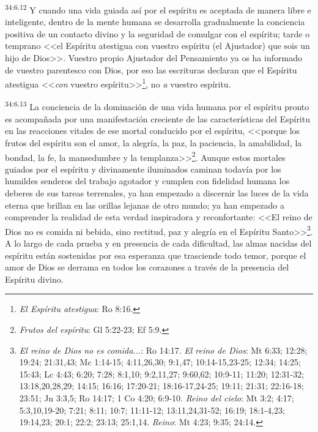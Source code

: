 \par
\textsuperscript{34:6.12} Y cuando una vida guiada así por el espíritu es aceptada de manera libre e inteligente, dentro de la mente humana se desarrolla gradualmente la conciencia positiva de un contacto divino y la seguridad de comulgar con el espíritu; tarde o temprano <<el Espíritu atestigua con vuestro espíritu (el Ajustador) que sois un hijo de Dios>>. Vuestro propio Ajustador del Pensamiento ya os ha informado de vuestro parentesco con Dios, por eso las escrituras declaran que el Espíritu atestigua <<\textit{con} vuestro espíritu>>\footnote{\textit{El Espíritu atestigua}: Ro 8:16.}, no \textit{a} vuestro espíritu.

\par
\textsuperscript{34:6.13} La conciencia de la dominación de una vida humana por el espíritu pronto es acompañada por una manifestación creciente de las características del Espíritu en las reacciones vitales de ese mortal conducido por el espíritu, <<porque los frutos del espíritu son el amor, la alegría, la paz, la paciencia, la amabilidad, la bondad, la fe, la mansedumbre y la templanza>>\footnote{\textit{Frutos del espíritu}: Gl 5:22-23; Ef 5:9.}. Aunque estos mortales guiados por el espíritu y divinamente iluminados caminan todavía por los humildes senderos del trabajo agotador y cumplen con fidelidad humana los deberes de sus tareas terrenales, ya han empezado a discernir las luces de la vida eterna que brillan en las orillas lejanas de otro mundo; ya han empezado a comprender la realidad de esta verdad inspiradora y reconfortante: <<El reino de Dios no es comida ni bebida, sino rectitud, paz y alegría en el Espíritu Santo>>\footnote{\textit{El reino de Dios no es comida...}: Ro 14:17. \textit{El reino de Dios}: Mt 6:33; 12:28; 19:24; 21:31,43; Mc 1:14-15; 4:11,26,30; 9:1,47; 10:14-15,23-25; 12:34; 14:25; 15:43; Lc 4:43; 6:20; 7:28; 8:1,10; 9:2,11,27; 9:60,62; 10:9-11; 11:20; 12:31-32; 13:18,20,28,29; 14:15; 16:16; 17:20-21; 18:16-17,24-25; 19:11; 21:31; 22:16-18; 23:51; Jn 3:3,5; Ro 14:17; 1 Co 4:20; 6:9-10. \textit{Reino del cielo}: Mt 3:2; 4:17; 5:3,10,19-20; 7:21; 8:11; 10:7; 11:11-12; 13:11,24,31-52; 16:19; 18:1-4,23; 19:14,23; 20:1; 22:2; 23:13; 25:1,14. \textit{Reino}: Mt 4:23; 9:35; 24:14.}. A lo largo de cada prueba y en presencia de cada dificultad, las almas nacidas del espíritu están sostenidas por esa esperanza que trasciende todo temor, porque el amor de Dios se derrama en todos los corazones a través de la presencia del Espíritu divino.


